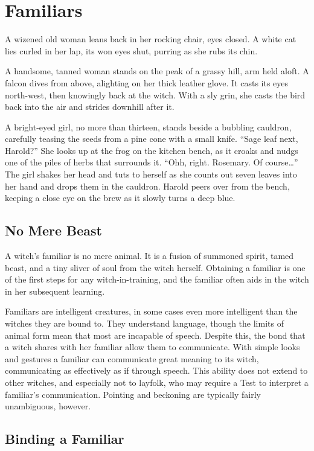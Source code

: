 \chapter{Familiars}

A wizened old woman leans back in her rocking chair, eyes closed.
A white cat lies curled in her lap, its won eyes shut, purring as she rubs its chin.

A handsome, tanned woman stands on the peak of a grassy hill, arm held aloft.
A falcon dives from above, alighting on her thick leather glove.
It casts its eyes north-west, then knowingly back at the witch.
With a sly grin, she casts the bird back into the air and strides downhill after it.

A bright-eyed girl, no more than thirteen, stands beside a bubbling cauldron, carefully teasing the seeds from a pine cone with a small knife.
``Sage leaf next, Harold?''
She looks up at the frog on the kitchen bench, as it croaks and nudgs one of the piles of herbs that surrounds it.
``Ohh, right. Rosemary. Of course\dots''
The girl shakes her head and tuts to herself as she counts out seven leaves into her hand and drops them in the cauldron.
Harold peers over from the bench, keeping a close eye on the brew as it slowly turns a deep blue.

\section{No Mere Beast}

A witch's familiar is no mere animal.
It is a fusion of summoned spirit, tamed beast, and a tiny sliver of soul from the witch herself.
Obtaining a familiar is one of the first steps for any witch-in-training, and the familiar often aids in the witch in her subsequent learning.

Familiars are intelligent creatures, in some cases even more intelligent than the witches they are bound to.
They understand language, though the limits of animal form mean that most are incapable of speech.
Despite this, the bond that a witch shares with her familiar allow them to communicate.
With simple looks and gestures a familiar can communicate great meaning to its witch, communicating as effectively as if through speech.
This ability does not extend to other witches, and especially not to layfolk, who may require a Test to interpret a familiar's communication.
Pointing and beckoning are typically fairly unambiguous, however.

\section{Binding a Familiar}

